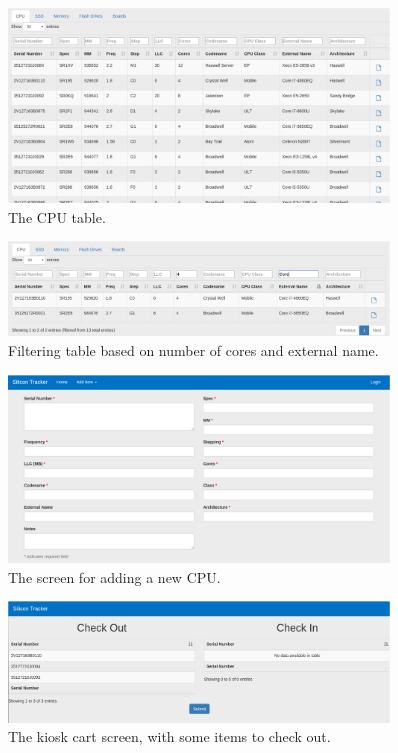 \documentclass[10pt, onecolumn, twoside, peerreview]{IEEEtran}
\begin{document}
\begin{figure}[!ht]
    \centering
    \captionsetup{justification=centering}
    \includegraphics[width=0.9\textwidth]{img-4.eps}
    \caption{The CPU table.}
\end{figure}

\begin{figure}[!ht]
    \centering
    \captionsetup{justification=centering}
    \includegraphics[width=0.9\textwidth]{img-3.eps}
    \caption{Filtering table based on number of cores and external name.}
\end{figure}

\begin{figure}[!ht]
    \centering
    \captionsetup{justification=centering}
    \includegraphics[width=0.9\textwidth]{img-2.eps}
    \caption{The screen for adding a new CPU.}
\end{figure}

\begin{figure}[!ht]
    \centering
    \captionsetup{justification=centering}
    \includegraphics[width=0.9\textwidth]{img-1.eps}
    \caption{The kiosk cart screen, with some items to check out.}
\end{figure}
\end{document}
